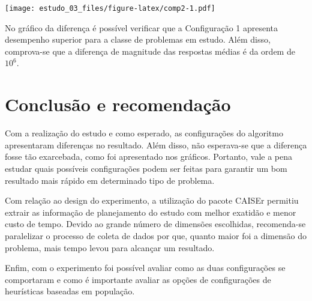 \documentclass[
]{article}
\begin{document}
\texttt{[image: estudo\_03\_files/figure-latex/comp2-1.pdf]}

No gráfico da diferença é possível verificar que a Configuração 1
apresenta desempenho superior para a classe de problemas em estudo. Além
disso, comprova-se que a diferença de magnitude das respostas médias é
da ordem de \(10^6\).

\hypertarget{conclusuxe3o-e-recomendauxe7uxe3o}{%
\section{Conclusão e
recomendação}\label{conclusuxe3o-e-recomendauxe7uxe3o}}

Com a realização do estudo e como esperado, as configurações do
algoritmo apresentaram diferenças no resultado. Além disso, não
esperava-se que a diferença fosse tão exarcebada, como foi apresentado
nos gráficos. Portanto, vale a pena estudar quais possíveis
configurações podem ser feitas para garantir um bom resultado mais
rápido em determinado tipo de problema.

Com relação ao design do experimento, a utilização do pacote CAISEr
permitiu extrair as informação de planejamento do estudo com melhor
exatidão e menor custo de tempo. Devido ao grande número de dimensões
escolhidas, recomenda-se paralelizar o processo de coleta de dados por
que, quanto maior foi a dimensão do problema, mais tempo levou para
alcançar um resultado.

Enfim, com o experimento foi possível avaliar como as duas configurações
se comportaram e como é importante avaliar as opções de configurações de
heurísticas baseadas em população.
\end{document}
